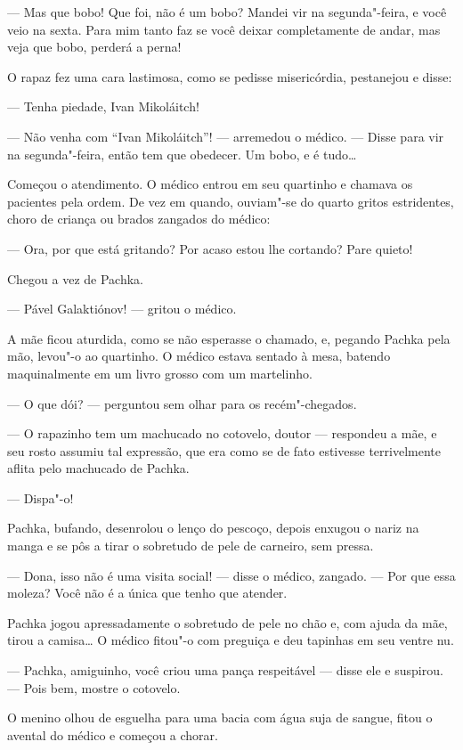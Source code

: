 --- Mas que bobo! Que foi, não é um bobo? Mandei vir na segunda"-feira, e
você veio na sexta. Para mim tanto faz se você deixar completamente de
andar, mas veja que bobo, perderá a perna!

O rapaz fez uma cara lastimosa, como se pedisse misericórdia, pestanejou
e disse:

--- Tenha piedade, Ivan Mikoláitch!

--- Não venha com ``Ivan Mikoláitch''! --- arremedou o médico. --- Disse
para vir na segunda"-feira, então tem que obedecer. Um bobo, e é tudo\ldots{}

Começou o atendimento. O médico entrou em seu quartinho e chamava os
pacientes pela ordem. De vez em quando, ouviam"-se do quarto gritos
estridentes, choro de criança ou brados zangados do médico:

--- Ora, por que está gritando? Por acaso estou lhe cortando? Pare
quieto!

Chegou a vez de Pachka.

--- Pável Galaktiónov! --- gritou o médico.

A mãe ficou aturdida, como se não esperasse o chamado, e, pegando Pachka
pela mão, levou"-o ao quartinho. O médico estava sentado à mesa, batendo
maquinalmente em um livro grosso com um martelinho.

--- O que dói? --- perguntou sem olhar para os recém"-chegados.

--- O rapazinho tem um machucado
no cotovelo, doutor --- respondeu a mãe, e seu rosto assumiu tal
expressão, que era como se de fato estivesse terrivelmente aflita pelo
machucado de Pachka.

--- Dispa"-o!

Pachka, bufando, desenrolou o lenço do pescoço, depois enxugou o nariz
na manga e se pôs a tirar o sobretudo de pele de carneiro, sem pressa.

--- Dona, isso não é uma visita social! --- disse o médico, zangado. ---
Por que essa moleza? Você não é a única que tenho que atender.

Pachka jogou apressadamente o sobretudo de pele no chão e, com ajuda da
mãe, tirou a camisa\ldots{} O médico fitou"-o com preguiça e deu tapinhas em
seu ventre nu.

--- Pachka, amiguinho, você criou uma pança respeitável --- disse ele e
suspirou. --- Pois bem, mostre o cotovelo.

O menino olhou de esguelha para uma bacia com água suja de sangue, fitou o
avental do médico e começou a chorar.

